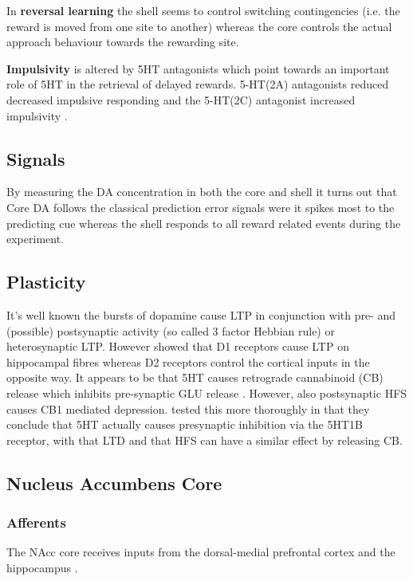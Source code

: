 \documentclass[12pt,a4paper]{article}
\begin{document}
In \textbf{reversal learning} \citep{Dalton2014} the shell seems to control
switching contingencies (i.e. the reward is moved from one site to
another) whereas the core controls the actual approach behaviour
towards the rewarding site.

\textbf{Impulsivity} is altered by 5HT antagonists which point towards an
important role of 5HT in the retrieval of delayed rewards. 5-HT(2A)
antagonists reduced decreased impulsive responding and the 5-HT(2C)
antagonist increased impulsivity \citep{Robinson2008}.

\subsection{Signals}
By measuring the DA concentration in both the core and shell
\citep{Saddoris2015} it turns out that Core DA follows the classical
prediction error signals were it spikes most to the predicting cue
whereas the shell responds to all reward related events during the
experiment.

\subsection{Plasticity}
It's well known the bursts of dopamine cause LTP in conjunction with
pre- and (possible) postsynaptic activity (so called 3 factor Hebbian
rule) or heterosynaptic LTP. However \citet{Goto2005} showed that D1
receptors cause LTP on hippocampal fibres whereas D2 receptors control
the cortical inputs in the opposite way.  It appears to be that 5HT
causes retrograde cannabinoid (CB) release which inhibits pre-synaptic
GLU release \citep{Burattini2014}. However, also postsynaptic HFS
causes CB1 mediated depression. \citet{Mathur2011} tested this more
thoroughly in that they conclude that 5HT actually causes presynaptic
inhibition via the 5HT1B receptor, with that LTD and that HFS can have
a similar effect by releasing CB.




\subsection{Nucleus Accumbens Core\label{core}}

\subsubsection{Afferents}
The NAcc core receives inputs from the dorsal-medial prefrontal cortex
and the hippocampus \citep{brog93}.
\end{document}
